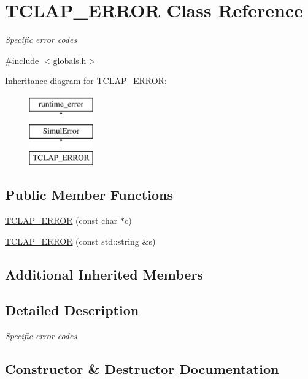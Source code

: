 \hypertarget{classTCLAP__ERROR}{}\section{T\+C\+L\+A\+P\+\_\+\+E\+R\+R\+OR Class Reference}
\label{classTCLAP__ERROR}


{\itshape Specific error codes}  




{\ttfamily \#include $<$globals.\+h$>$}

Inheritance diagram for T\+C\+L\+A\+P\+\_\+\+E\+R\+R\+OR\+:\begin{figure}[H]
\begin{center}
\leavevmode
\includegraphics[height=3.000000cm]{classTCLAP__ERROR}
\end{center}
\end{figure}
\subsection*{Public Member Functions}
\begin{DoxyCompactItemize}
\item 
\hyperlink{classTCLAP__ERROR_a9fadfa86a7a882c2db2fc8efcc8cabb4}{T\+C\+L\+A\+P\+\_\+\+E\+R\+R\+OR} (const char $\ast$c)
\item 
\hyperlink{classTCLAP__ERROR_a8df7cf40b000475e793bb76517256db3}{T\+C\+L\+A\+P\+\_\+\+E\+R\+R\+OR} (const std\+::string \&s)
\end{DoxyCompactItemize}
\subsection*{Additional Inherited Members}


\subsection{Detailed Description}
{\itshape Specific error codes} 

\subsection{Constructor \& Destructor Documentation}
\mbox{\label{classTCLAP__ERROR_a9fadfa86a7a882c2db2fc8efcc8cabb4}} 
